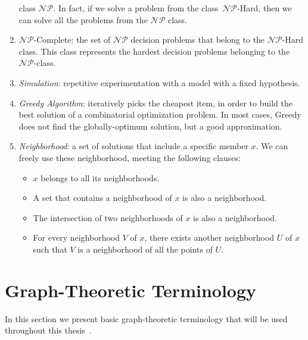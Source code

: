\begin{enumerate}
    class $\mathcal{NP}$. In fact, if we solve a problem from the class~$\mathcal{NP}$-Hard, then we can 
    solve all the problems from the $\mathcal{NP}$ class. 
    \item $\mathcal{NP}$-Complete: the set of $\mathcal{NP}$ decision problems that belong to the 
    $\mathcal{NP}$-Hard class. 
    This class represents the hardest decision problems belonging to the $\mathcal{NP}$-class.   
    \item \emph{Simulation}: repetitive experimentation with a model with a fixed hypothesis.
   \item \emph{Greedy Algorithm}: iteratively picks the cheapest item, in order to build the best solution of a combinatorial optimization problem. In most cases, Greedy does not find the globally-optimum solution, but a good approximation.
   \item \emph{Neighborhood}: a set of solutions that include a specific member $x$. We can freely use these neighborhood, meeting the following clauses:
   \begin{itemize}
    \item $x$ belongs to all its neighborhoods. 
    \item A set that contains a neighborhood of $x$ is also a neighborhood. 
    \item The intersection of two neighborhoods of $x$ is also a neighborhood. 
    \item For every neighborhood $V$ of $x$, there exists another neighborhood $U$ of $x$ such that $V$ 
    is a neighborhood of all the points of $U$.  
   \end{itemize}
\end{enumerate}

\section{Graph-Theoretic Terminology}
In this section we present basic graph-theoretic terminology that will be used throughout this thesis~\cite{11}.

